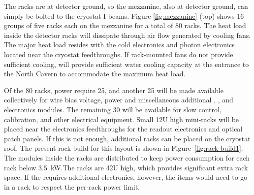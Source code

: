 The racks are %
at detector ground, so the mezzanine, %
also at detector 
ground, %
can simply be bolted to the cryostat I-beams. 
Figure \ref{fig:mezzanine} (top) shows 16 groups of five racks each %
on the mezzanine for a total of 80 racks. 
The heat load inside the detector racks will %
dissipate through air flow generated by cooling fans.  The major heat load resides with the cold electronics and photon electronics located near the cryostat feedthroughs.  If rack-mounted fans do not provide sufficient cooling,   will provide sufficient water cooling capacity at the entrance to the North Cavern to accommodate the maximum heat load. 


Of the 80 racks,   power require \num{25}, and another 25 will be made available collectively for   wire bias voltage,  power and miscellaneous additional , , and   electronics modules. The remaining 30 will be available for slow control, calibration, and other electrical equipment. Small 12U high mini-racks will  be placed near the electronics feedthroughs for the  readout electronics and optical patch panels. If this is not enough, additional racks can be placed on the cryostat roof. The present rack build for this layout is shown in Figure~\ref{fig:rack-build1}. 
 The modules  inside the racks are distributed to keep power consumption for each rack below \SI{3.5}{kW}.The racks are 42U high, which provides significant extra rack space.  If the  requires additional electronics, however, the items would need to go in a  rack to respect the per-rack power limit.


